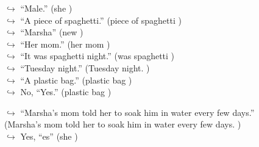 \documentclass[11pt,a4paper, onecolumn]{article}
\begin{document}
\begin{figure}[t] \small \begin{tcolorbox}[boxsep=0pt,left=5pt,right=0pt,top=2pt,colback = yellow!5] \begin{dialogue}
 \small 
\colorbox{pink!25}{$\hookrightarrow$}
{ ``Male.'' (she ) }
\\
\colorbox{pink!25}{$\hookrightarrow$}
{ ``A piece of spaghetti.'' (piece of spaghetti ) }
\\
\colorbox{pink!25}{$\hookrightarrow$}
{ ``Marsha'' (new ) }
\\
\colorbox{pink!25}{$\hookrightarrow$}
{ ``Her mom.'' (her mom ) }
\\
\colorbox{pink!25}{$\hookrightarrow$}
{ ``It was spaghetti night.'' (was spaghetti ) }
\\
\colorbox{pink!25}{$\hookrightarrow$}
{ ``Tuesday night.'' (Tuesday night. ) }
\\
\colorbox{pink!25}{$\hookrightarrow$}
{ ``A plastic bag.'' (plastic bag ) }
\\
\colorbox{pink!25}{$\hookrightarrow$}
\colorbox{red!25}{No,}
{ ``Yes.'' (plastic bag ) }
 \end{dialogue}\end{tcolorbox}\end{figure}\begin{figure}[t] \small \begin{tcolorbox}[boxsep=0pt,left=5pt,right=0pt,top=2pt,colback = yellow!5] \begin{dialogue}
 \small 
\colorbox{pink!25}{$\hookrightarrow$}
{ ``Marsha's mom told her to soak him in water every few days.'' (Marsha's mom told her to soak him in water every few days. ) }
\\
\colorbox{pink!25}{$\hookrightarrow$}
\colorbox{red!25}{Yes,}
{ ``es'' (she ) }
\\
 \end{dialogue}\end{tcolorbox}\end{figure}
\end{document}
